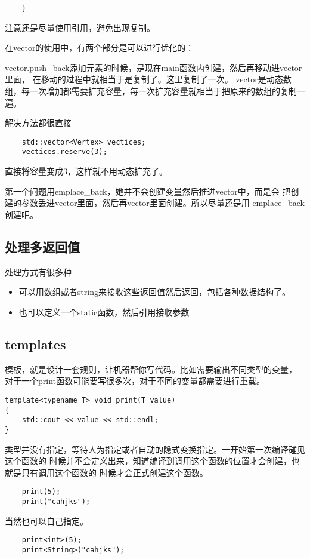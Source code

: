 \documentclass{article}
\begin{document}
\begin{sloppypar}
\begin{lstlisting}
	}
\end{lstlisting}
注意还是尽量使用引用，避免出现复制。

在vector的使用中，有两个部分是可以进行优化的：
\begin{outline}
	\1 vector.push\_back添加元素的时候，是现在main函数内创建，然后再移动进vector里面，
	在移动的过程中就相当于是复制了。这里复制了一次。
	\1 vector是动态数组，每一次增加都需要扩充容量，每一次扩充容量就相当于把原来的数组的复制一遍。
\end{outline}
解决方法都很直接
\begin{lstlisting}
	std::vector<Vertex> vectices;
	vectices.reserve(3);
\end{lstlisting}
直接将容量变成3，这样就不用动态扩充了。

第一个问题用emplace\_back，她并不会创建变量然后推进vector中，而是会
把创建的参数丢进vector里面，然后再vector里面创建。所以尽量还是用
emplace\_back创建吧。

\subsection{处理多返回值}
处理方式有很多种
\begin{itemize}
	\item 可以用数组或者string来接收这些返回值然后返回，包括各种数据结构了。
	\item 也可以定义一个static函数，然后引用接收参数
\end{itemize}

\subsection{templates}
模板，就是设计一套规则，让机器帮你写代码。比如需要输出不同类型的变量，
对于一个print函数可能要写很多次，对于不同的变量都需要进行重载。
\begin{lstlisting}
template<typename T> void print(T value)
{
    std::cout << value << std::endl;
}
\end{lstlisting}
类型并没有指定，等待人为指定或者自动的隐式变换指定。一开始第一次编译碰见这个函数的
时候并不会定义出来，知道编译到调用这个函数的位置才会创建，也就是只有调用这个函数的
时候才会正式创建这个函数。
\begin{lstlisting}
	print(5);
    print("cahjks");
\end{lstlisting}
当然也可以自己指定。
\begin{lstlisting}
	print<int>(5);
    print<String>("cahjks");
\end{lstlisting}


\end{sloppypar}
\end{document}
